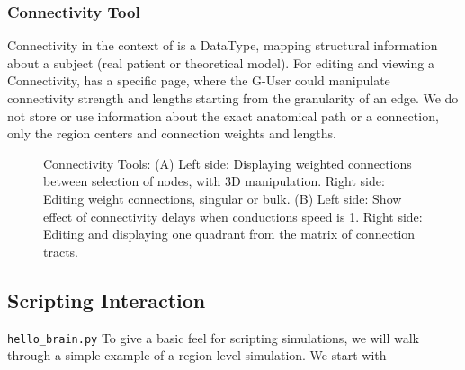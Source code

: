 	\subsubsection{Connectivity Tool}

Connectivity in the context of \TVB is a DataType, mapping structural information about a subject (real patient or theoretical model).
For editing and viewing a Connectivity, \TVB has a specific page, where the G-User could manipulate connectivity strength and lengths 
starting from the granularity of an edge.
We do not store or use information about the exact anatomical path or a connection, only the region centers and connection weights and lengths.

 \begin{figure}
 	\centering
	\qquad
	\caption{Connectivity Tools: 
	(A) Left side: Displaying weighted connections between selection of nodes, with 3D manipulation.
	Right side: Editing weight connections, singular or bulk.
	(B) Left side: Show effect of connectivity delays when conductions speed is 1.
	Right side: Editing and displaying one quadrant from the matrix of connection tracts.}
        \label{fig:connectivity}
\end{figure}



\subsection{Scripting Interaction}

\texttt{hello\_brain.py}
To give a basic feel for scripting \TVB simulations, we will 
walk through a simple example of a region-level simulation. We 
start with

